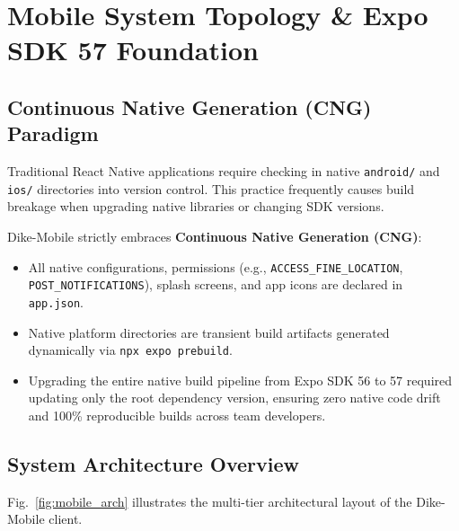 \documentclass[conference,10pt,a4paper]{IEEEtran}
\begin{document}
\section{Mobile System Topology \& Expo SDK 57 Foundation}

\subsection{Continuous Native Generation (CNG) Paradigm}
Traditional React Native applications require checking in native \texttt{android/} and \texttt{ios/} directories into version control. This practice frequently causes build breakage when upgrading native libraries or changing SDK versions.

Dike-Mobile strictly embraces \textbf{Continuous Native Generation (CNG)}:
\begin{itemize}
    \item All native configurations, permissions (e.g., \texttt{ACCESS\_FINE\_LOCATION}, \texttt{POST\_NOTIFICATIONS}), splash screens, and app icons are declared in \texttt{app.json}.
    \item Native platform directories are transient build artifacts generated dynamically via \texttt{npx expo prebuild}.
    \item Upgrading the entire native build pipeline from Expo SDK 56 to 57 required updating only the root dependency version, ensuring zero native code drift and 100\% reproducible builds across team developers.
\end{itemize}

\subsection{System Architecture Overview}
Fig.~\ref{fig:mobile_arch} illustrates the multi-tier architectural layout of the Dike-Mobile client.
\end{document}
